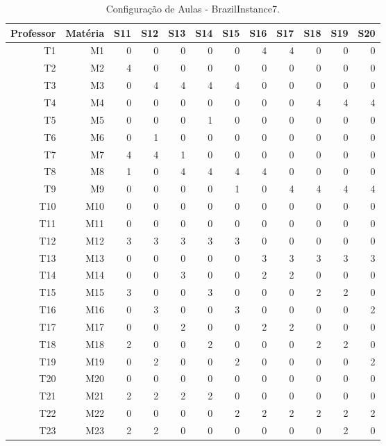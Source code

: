 \begin{table}[h]
	\centering
	\caption[Configuração de Aulas das turmas S11 a S20 - BrazilInstance7]{Configuração de Aulas - BrazilInstance7.
		\label{tab:config_aulas_br7_2}}
	\begin{tabular}{rrrrrrrrrrrr}
		\toprule
		Professor & Matéria & S11 & S12 & S13 & S14 & S15 & S16 & S17 & S18 & S19 & S20 \\
		\midrule
		T1 & M1 & 0 & 0 & 0 & 0 & 0 & 4 & 4 & 0 & 0 & 0 \\
		T2 & M2 & 4 & 0 & 0 & 0 & 0 & 0 & 0 & 0 & 0 & 0 \\
		T3 & M3 & 0 & 4 & 4 & 4 & 4 & 0 & 0 & 0 & 0 & 0 \\
		T4 & M4 & 0 & 0 & 0 & 0 & 0 & 0 & 0 & 4 & 4 & 4 \\
		T5 & M5 & 0 & 0 & 0 & 1 & 0 & 0 & 0 & 0 & 0 & 0 \\
		T6 & M6 & 0 & 1 & 0 & 0 & 0 & 0 & 0 & 0 & 0 & 0 \\
		T7 & M7 & 4 & 4 & 1 & 0 & 0 & 0 & 0 & 0 & 0 & 0 \\
		T8 & M8 & 1 & 0 & 4 & 4 & 4 & 4 & 0 & 0 & 0 & 0 \\
		T9 & M9 & 0 & 0 & 0 & 0 & 1 & 0 & 4 & 4 & 4 & 4 \\
		T10 & M10 & 0 & 0 & 0 & 0 & 0 & 0 & 0 & 0 & 0 & 0 \\
		T11 & M11 & 0 & 0 & 0 & 0 & 0 & 0 & 0 & 0 & 0 & 0 \\
		T12 & M12 & 3 & 3 & 3 & 3 & 3 & 0 & 0 & 0 & 0 & 0 \\
		T13 & M13 & 0 & 0 & 0 & 0 & 0 & 3 & 3 & 3 & 3 & 3 \\
		T14 & M14 & 0 & 0 & 3 & 0 & 0 & 2 & 2 & 0 & 0 & 0 \\
		T15 & M15 & 3 & 0 & 0 & 3 & 0 & 0 & 0 & 2 & 2 & 0 \\
		T16 & M16 & 0 & 3 & 0 & 0 & 3 & 0 & 0 & 0 & 0 & 2 \\
		T17 & M17 & 0 & 0 & 2 & 0 & 0 & 2 & 2 & 0 & 0 & 0 \\
		T18 & M18 & 2 & 0 & 0 & 2 & 0 & 0 & 0 & 2 & 2 & 0 \\
		T19 & M19 & 0 & 2 & 0 & 0 & 2 & 0 & 0 & 0 & 0 & 2 \\
		T20 & M20 & 0 & 0 & 0 & 0 & 0 & 0 & 0 & 0 & 0 & 0 \\
		T21 & M21 & 2 & 2 & 2 & 2 & 0 & 0 & 0 & 0 & 0 & 0 \\
		T22 & M22 & 0 & 0 & 0 & 0 & 2 & 2 & 2 & 2 & 2 & 2 \\
		T23 & M23 & 2 & 2 & 0 & 0 & 0 & 0 & 0 & 0 & 2 & 0 \\

\end{tabular}
\end{table}
